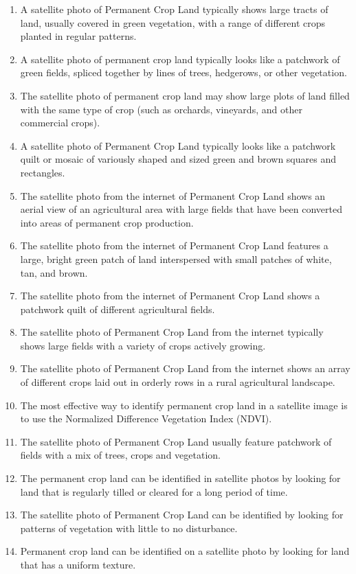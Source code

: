 \documentclass[11pt]{article}
\begin{document}
\begin{enumerate}
\item A satellite photo of Permanent Crop Land typically shows large tracts of land, usually covered in green vegetation, with a range of different crops planted in regular patterns.
\item A satellite photo of permanent crop land typically looks like a patchwork of green fields, spliced together by lines of trees, hedgerows, or other vegetation.
\item The satellite photo of permanent crop land may show large plots of land filled with the same type of crop (such as orchards, vineyards, and other commercial crops).
\item A satellite photo of Permanent Crop Land typically looks like a patchwork quilt or mosaic of variously shaped and sized green and brown squares and rectangles.
\item The satellite photo from the internet of Permanent Crop Land shows an aerial view of an agricultural area with large fields that have been converted into areas of permanent crop production.
\item The satellite photo from the internet of Permanent Crop Land features a large, bright green patch of land interspersed with small patches of white, tan, and brown.
\item The satellite photo from the internet of Permanent Crop Land shows a patchwork quilt of different agricultural fields.
\item The satellite photo of Permanent Crop Land from the internet typically shows large fields with a variety of crops actively growing.
\item The satellite photo of Permanent Crop Land from the internet shows an array of different crops laid out in orderly rows in a rural agricultural landscape.
\item The most effective way to identify permanent crop land in a satellite image is to use the Normalized Difference Vegetation Index (NDVI).
\item The satellite photo of Permanent Crop Land usually feature patchwork of fields with a mix of trees, crops and vegetation.
\item The permanent crop land can be identified in satellite photos by looking for land that is regularly tilled or cleared for a long period of time.
\item The satellite photo of Permanent Crop Land can be identified by looking for patterns of vegetation with little to no disturbance.
\item Permanent crop land can be identified on a satellite photo by looking for land that has a uniform texture.
\end{enumerate}
\end{document}
